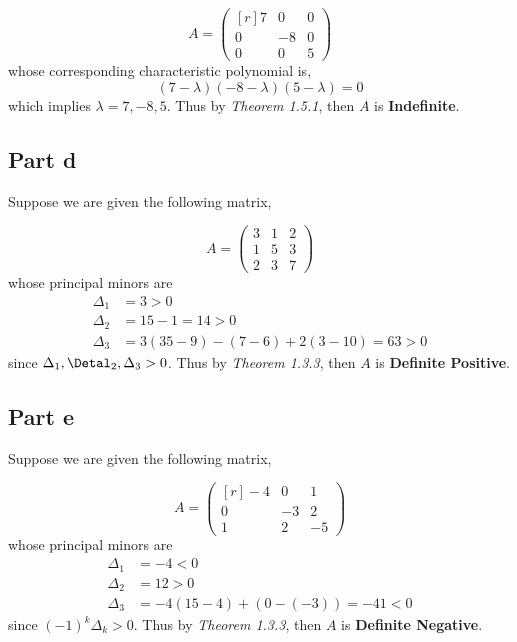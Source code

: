 \documentclass{article}
\begin{document}
\begin{equation*}
   A = \begin{pmatrix*}[r]
    7 & 0 & 0 \\
    0 & -8 & 0 \\
    0 & 0 & 5
    \end{pmatrix*}
\end{equation*}
whose corresponding characteristic polynomial is,
\begin{equation*}
    (7-\lambda)(-8-\lambda)(5-\lambda) = 0
\end{equation*}
which implies $\lambda = 7,-8,5$. Thus by \textit{Theorem 1.5.1}, then $A$ is \textbf{Indefinite}.

\subsection*{Part d}
Suppose we are given the following matrix,

\begin{equation*}
   A = \begin{pmatrix}
    3 & 1 & 2 \\
    1 & 5 & 3 \\
    2 & 3 & 7
    \end{pmatrix}
\end{equation*}
whose principal minors are
\begin{align*}
    \Delta_1 &= 3 > 0\\
    \Delta_2 &= 15-1 = 14 > 0 \\
    \Delta_3 &= 3(35-9) - (7-6) + 2(3-10) = 63 > 0
\end{align*}
since $\Delta_1, \Detal_2, \Delta_3 > 0$. Thus by \textit{Theorem 1.3.3}, then $A$ is \textbf{Definite Positive}.

\subsection*{Part e}
Suppose we are given the following matrix,

\begin{equation*}
   A = \begin{pmatrix*}[r]
    -4 & 0 & 1 \\
    0 & -3 & 2 \\
    1 & 2 & -5
    \end{pmatrix*}
\end{equation*}
whose principal minors are
\begin{align*}
    \Delta_1 &= -4 < 0\\
    \Delta_2 &= 12 > 0 \\
    \Delta_3 &= -4(15-4) + (0 - (-3)) = -41 < 0
\end{align*}
since $(-1)^k\Delta_k > 0$. Thus by \textit{Theorem 1.3.3}, then $A$ is \textbf{Definite Negative}.
\end{document}

